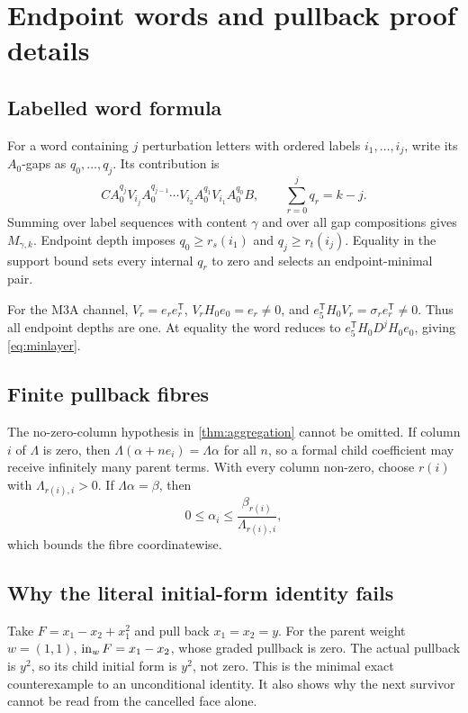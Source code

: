 \section{Endpoint words and pullback proof details}\label{app:endpointpb1}

\subsection{Labelled word formula}

For a word containing \(j\) perturbation letters with ordered labels
\(i_1,\ldots,i_j\), write its \(A_0\)-gaps as
\(q_0,\ldots,q_j\).  Its contribution is
\[
CA_0^{q_j}V_{i_j}A_0^{q_{j-1}}\cdots
V_{i_2}A_0^{q_1}V_{i_1}A_0^{q_0}B,
\qquad \sum_{r=0}^j q_r=k-j.
\]
Summing over label sequences with content \(\gamma\) and over all gap
compositions gives \(M_{\gamma,k}\).  Endpoint depth imposes
\(q_0\ge r_s(i_1)\) and \(q_j\ge r_t(i_j)\).  Equality in the support bound
sets every internal \(q_r\) to zero and selects an endpoint-minimal pair.

For the M3A channel, \(V_r=e_re_r^{\mathsf T}\),
\(V_rH_0e_0=e_r\ne0\), and
\(e_5^{\mathsf T}H_0V_r=\sigma_re_r^{\mathsf T}\ne0\).  Thus all endpoint
depths are one.  At equality the word reduces to
\(e_5^{\mathsf T}H_0D^jH_0e_0\), giving \cref{eq:minlayer}.

\subsection{Finite pullback fibres}

The no-zero-column hypothesis in \cref{thm:aggregation} cannot be omitted.  If
column \(i\) of \(\Lambda\) is zero, then \(\Lambda(\alpha+ne_i)=\Lambda\alpha\)
for all \(n\), so a formal child coefficient may receive infinitely many parent
terms.  With every column non-zero, choose \(r(i)\) with
\(\Lambda_{r(i),i}>0\).  If \(\Lambda\alpha=\beta\), then
\[
0\le\alpha_i\le \frac{\beta_{r(i)}}{\Lambda_{r(i),i}},
\]
which bounds the fibre coordinatewise.

\subsection{Why the literal initial-form identity fails}

Take \(F=x_1-x_2+x_1^2\) and pull back \(x_1=x_2=y\).  For the parent weight
\(w=(1,1)\), \(\operatorname{in}_wF=x_1-x_2\), whose graded pullback is zero.  The actual
pullback is \(y^2\), so its child initial form is \(y^2\), not zero.  This is the
minimal exact counterexample to an unconditional identity.  It also shows why
the next survivor cannot be read from the cancelled face alone.
